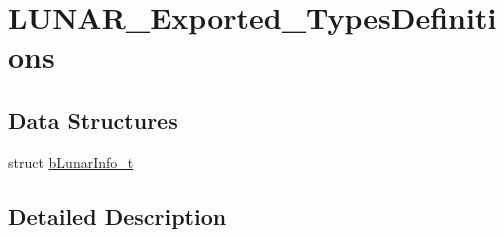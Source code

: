 \hypertarget{group___l_u_n_a_r___exported___types_definitions}{}\section{L\+U\+N\+A\+R\+\_\+\+Exported\+\_\+\+Types\+Definitions}
\label{group___l_u_n_a_r___exported___types_definitions}
\subsection*{Data Structures}
\begin{DoxyCompactItemize}
\item 
struct \mbox{\hyperlink{structb_lunar_info__t}{b\+Lunar\+Info\+\_\+t}}
\end{DoxyCompactItemize}


\subsection{Detailed Description}
